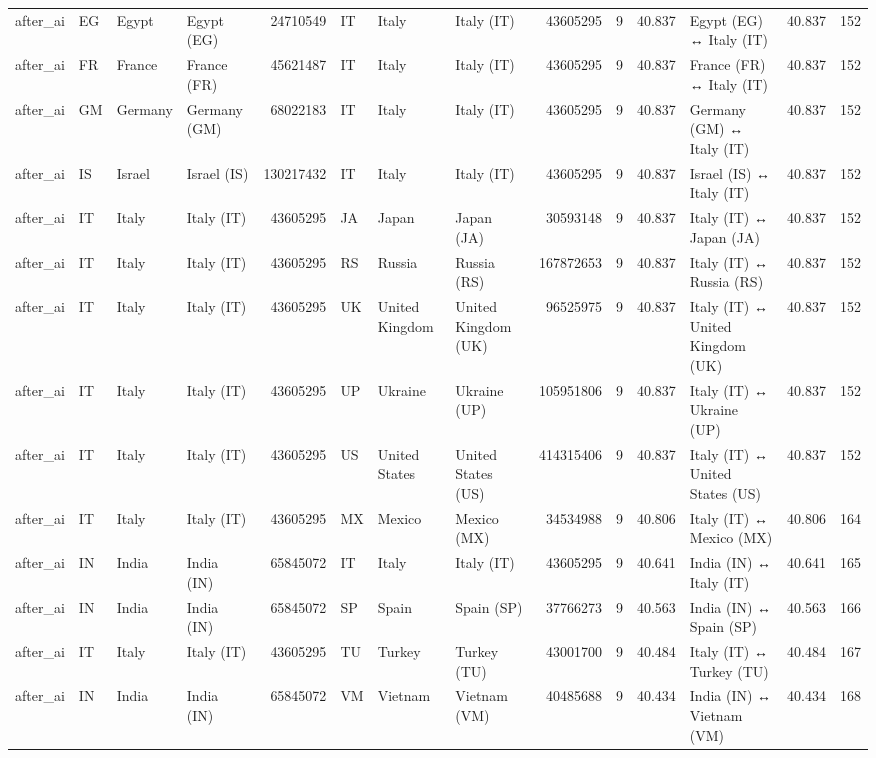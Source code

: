 \begin{tabular}{llllrlllrrrlrr}
after\_ai & EG & Egypt & Egypt (EG) & 24710549 & IT & Italy & Italy (IT) & 43605295 & 9 & 40.837 & Egypt (EG) ↔ Italy (IT) & 40.837 & 152 \\
after\_ai & FR & France & France (FR) & 45621487 & IT & Italy & Italy (IT) & 43605295 & 9 & 40.837 & France (FR) ↔ Italy (IT) & 40.837 & 152 \\
after\_ai & GM & Germany & Germany (GM) & 68022183 & IT & Italy & Italy (IT) & 43605295 & 9 & 40.837 & Germany (GM) ↔ Italy (IT) & 40.837 & 152 \\
after\_ai & IS & Israel & Israel (IS) & 130217432 & IT & Italy & Italy (IT) & 43605295 & 9 & 40.837 & Israel (IS) ↔ Italy (IT) & 40.837 & 152 \\
after\_ai & IT & Italy & Italy (IT) & 43605295 & JA & Japan & Japan (JA) & 30593148 & 9 & 40.837 & Italy (IT) ↔ Japan (JA) & 40.837 & 152 \\
after\_ai & IT & Italy & Italy (IT) & 43605295 & RS & Russia & Russia (RS) & 167872653 & 9 & 40.837 & Italy (IT) ↔ Russia (RS) & 40.837 & 152 \\
after\_ai & IT & Italy & Italy (IT) & 43605295 & UK & United Kingdom & United Kingdom (UK) & 96525975 & 9 & 40.837 & Italy (IT) ↔ United Kingdom (UK) & 40.837 & 152 \\
after\_ai & IT & Italy & Italy (IT) & 43605295 & UP & Ukraine & Ukraine (UP) & 105951806 & 9 & 40.837 & Italy (IT) ↔ Ukraine (UP) & 40.837 & 152 \\
after\_ai & IT & Italy & Italy (IT) & 43605295 & US & United States & United States (US) & 414315406 & 9 & 40.837 & Italy (IT) ↔ United States (US) & 40.837 & 152 \\
after\_ai & IT & Italy & Italy (IT) & 43605295 & MX & Mexico & Mexico (MX) & 34534988 & 9 & 40.806 & Italy (IT) ↔ Mexico (MX) & 40.806 & 164 \\
after\_ai & IN & India & India (IN) & 65845072 & IT & Italy & Italy (IT) & 43605295 & 9 & 40.641 & India (IN) ↔ Italy (IT) & 40.641 & 165 \\
after\_ai & IN & India & India (IN) & 65845072 & SP & Spain & Spain (SP) & 37766273 & 9 & 40.563 & India (IN) ↔ Spain (SP) & 40.563 & 166 \\
after\_ai & IT & Italy & Italy (IT) & 43605295 & TU & Turkey & Turkey (TU) & 43001700 & 9 & 40.484 & Italy (IT) ↔ Turkey (TU) & 40.484 & 167 \\
after\_ai & IN & India & India (IN) & 65845072 & VM & Vietnam & Vietnam (VM) & 40485688 & 9 & 40.434 & India (IN) ↔ Vietnam (VM) & 40.434 & 168 \\

\end{tabular}
